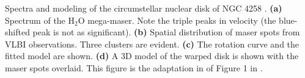\label{fig:h2o_ngc4258} Spectra and modeling of the circumstellar nuclear disk of NGC 4258 \citep{Bragg_2000}. {\bf (a)} Spectrum of the H$_2$O mega-maser. Note the triple peaks in velocity (the blue-shifted peak is not as significant). {\bf (b)} Spatial distribution of maser spots from VLBI observations. Three clusters are evident. {\bf (c)} The rotation curve and the fitted model are shown. {\bf (d)} A 3D model of the warped disk is shown with the maser spots overlaid. This figure is the adaptation in \citet{lo2005} of Figure 1 in \citet{Bragg_2000}.